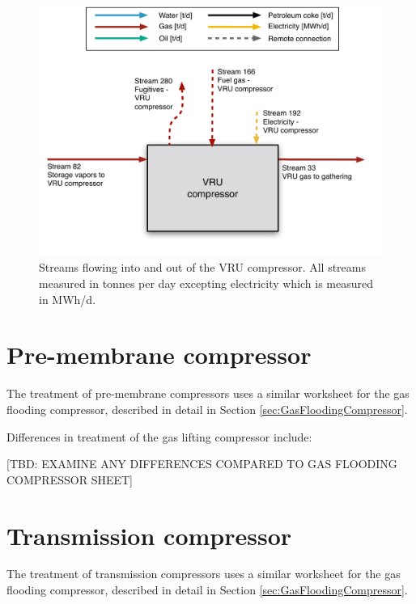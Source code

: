 \documentclass[11pt]{report}
\begin{document}
{%
\begin{figure}
\includegraphics[width=0.85\columnwidth]{images/VRU_compressor_PF.pdf}
\caption{Streams flowing into and out of the VRU compressor. All streams measured in tonnes per day excepting electricity which is measured in MWh/d.}
\label{fig:VRU_compressor_PF}
\end{figure}




\clearpage

\section{Pre-membrane compressor}
\label{sec:pre_membrane_compressor}


The treatment of pre-membrane compressors uses a similar worksheet for the gas flooding compressor, described in detail in Section \ref{sec:GasFloodingCompressor}.

Differences in treatment of the gas lifting compressor include:

[TBD: EXAMINE ANY DIFFERENCES COMPARED TO GAS FLOODING COMPRESSOR SHEET]





\clearpage

\section{Transmission compressor}
\label{sec:transmission_compressor}

The treatment of transmission compressors uses a similar worksheet for the gas flooding compressor, described in detail in Section \ref{sec:GasFloodingCompressor}.

}
\end{document}
